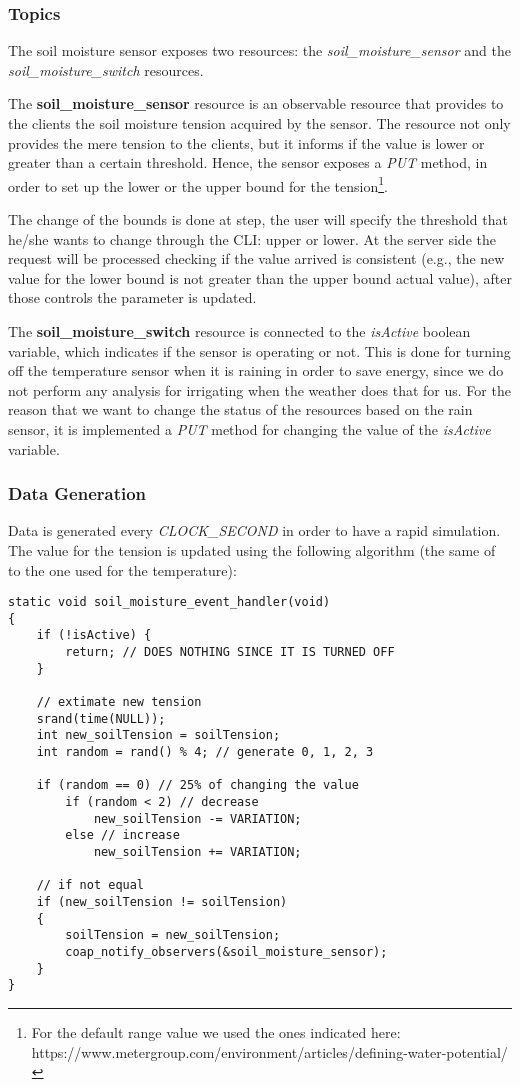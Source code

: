 \subsubsection{Topics}
The soil moisture sensor exposes two resources: the \textit{soil\_moisture\_sensor} and the \textit{soil\_moisture\_switch} resources.

The \textbf{soil\_moisture\_sensor} resource is an observable resource that provides to the clients the soil moisture tension acquired by the sensor. The resource not only provides the mere tension to the clients, but it informs if the value is lower or greater than a certain threshold. Hence, the sensor exposes a  \textit{PUT} method, in order to set up the lower or the upper bound for the tension\footnote{For the default range value we used the ones indicated here: https://www.metergroup.com/environment/articles/defining-water-potential/ }.

The change of the bounds is done at step, the user will specify the threshold that he/she wants to change through the CLI: upper or lower. At the server side the request will be processed checking if the value arrived is consistent (e.g., the new value for the lower bound is not greater than the upper bound actual value), after those controls the parameter is updated.

The \textbf{soil\_moisture\_switch} resource is connected to the \textit{isActive} boolean variable, which indicates if the sensor is operating or not. This is done for turning off the temperature sensor when it is raining in order to save energy, since we do not perform any analysis for irrigating when the weather does that for us. For the reason that we want to change the status of the resources based on the rain sensor, it is implemented a \textit{PUT} method for changing the value of the \textit{isActive} variable.

\subsubsection{Data Generation}
Data is generated every \textit{CLOCK\_SECOND} in order to have a rapid simulation. The value for the tension is updated using the following algorithm (the same of to the one used for the temperature):

\begin{lstlisting}
static void soil_moisture_event_handler(void)
{
    if (!isActive) {
        return; // DOES NOTHING SINCE IT IS TURNED OFF
    }
    
    // extimate new tension
    srand(time(NULL));
    int new_soilTension = soilTension;
    int random = rand() % 4; // generate 0, 1, 2, 3
    
    if (random == 0) // 25% of changing the value
        if (random < 2) // decrease
            new_soilTension -= VARIATION;
        else // increase
            new_soilTension += VARIATION;

    // if not equal
    if (new_soilTension != soilTension)
    {
        soilTension = new_soilTension;
        coap_notify_observers(&soil_moisture_sensor);
    }
}
\end{lstlisting}



